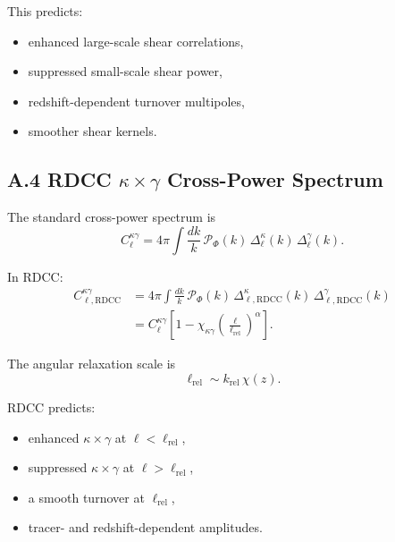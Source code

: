 \documentclass[11pt,a4paper]{article}
\begin{document}
This predicts:

\begin{itemize}
    \item enhanced large-scale shear correlations,
    \item suppressed small-scale shear power,
    \item redshift-dependent turnover multipoles,
    \item smoother shear kernels.
\end{itemize}

\subsection*{A.4 RDCC $\kappa \times \gamma$ Cross-Power Spectrum}

The standard cross-power spectrum is
\begin{equation}
    C_{\ell}^{\kappa\gamma}
    = 4\pi \int \frac{dk}{k}\,
      \mathcal{P}_{\Phi}(k)\,
      \Delta_{\ell}^{\kappa}(k)\,
      \Delta_{\ell}^{\gamma}(k).
\end{equation}

In RDCC:
\begin{align}
    C_{\ell,\mathrm{RDCC}}^{\kappa\gamma}
    &= 4\pi \int \frac{dk}{k}\,
       \mathcal{P}_{\Phi}(k)\,
       \Delta_{\ell,\mathrm{RDCC}}^{\kappa}(k)\,
       \Delta_{\ell,\mathrm{RDCC}}^{\gamma}(k) \\
    &= C_{\ell}^{\kappa\gamma}
       \left[
         1 - \chi_{\kappa\gamma}
         \left(\frac{\ell}{\ell_{\mathrm{rel}}}\right)^{\alpha}
       \right].
\end{align}

The angular relaxation scale is
\begin{equation}
    \ell_{\mathrm{rel}}
    \sim k_{\mathrm{rel}}\,\chi(z).
\end{equation}

RDCC predicts:

\begin{itemize}
    \item enhanced $\kappa \times \gamma$ at $\ell < \ell_{\mathrm{rel}}$,
    \item suppressed $\kappa \times \gamma$ at $\ell > \ell_{\mathrm{rel}}$,
    \item a smooth turnover at $\ell_{\mathrm{rel}}$,
    \item tracer- and redshift-dependent amplitudes.
\end{itemize}
\end{document}
